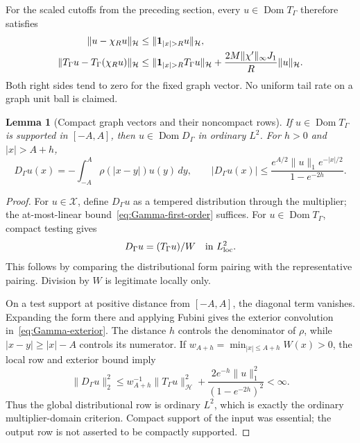 \documentclass[11pt,a4paper]{article}
\numberwithin{equation}{section}
\newtheorem{lemma}[theorem]{Lemma}
\theoremstyle{definition}
\theoremstyle{remark}
\newcommand{\Hh}{\mathcal H}
\newcommand{\norm}[1]{\lVert #1\rVert}
\begin{document}
For the scaled cutoffs from the preceding section, every $u\in\operatorname{Dom}T_\Gamma$ therefore satisfies
\begin{align}
 \norm{u-\chi_Ru}_{\Hh}&\le\norm{\boldsymbol1_{|x|>R}u}_{\Hh},\notag\\
 \norm{T_\Gamma u-T_\Gamma(\chi_Ru)}_{\Hh}
 &\le\norm{\boldsymbol1_{|x|>R}T_\Gamma u}_{\Hh}
       +\frac{2M\norm{\chi'}_\infty J_1}{R}\norm{u}_{\Hh}.
 \label{eq:Gamma-cutoff-graph}
\end{align}
Both right sides tend to zero for the fixed graph vector. No uniform tail rate on a graph unit ball is claimed.

\begin{lemma}[Compact graph vectors and their noncompact rows]\label{lem:Gamma-compact-row}
If $u\in\operatorname{Dom}T_\Gamma$ is supported in $[-A,A]$, then $u\in\operatorname{Dom}D_\Gamma$ in ordinary $L^2$. For $h>0$ and $|x|>A+h$,
\begin{equation}\label{eq:Gamma-exterior}
 D_\Gamma u(x)=-\int_{-A}^A\rho(|x-y|)u(y)\,dy,
 \qquad
 |D_\Gamma u(x)|\le
 \frac{e^{A/2}\norm{u}_1e^{-|x|/2}}{1-e^{-2h}}.
\end{equation}
\end{lemma}
\begin{proof}
For $u\in\mathcal X$, define $D_\Gamma u$ as a tempered distribution through the multiplier; the at-most-linear bound~\eqref{eq:Gamma-first-order} suffices. For $u\in\operatorname{Dom}T_\Gamma$, compact testing gives
\begin{equation}\label{eq:Gamma-local-row}
 D_\Gamma u=(T_\Gamma u)/W\quad\hbox{in }L^2_{\rm loc}.
\end{equation}
This follows by comparing the distributional form pairing with the representative pairing. Division by $W$ is legitimate locally only.

On a test support at positive distance from $[-A,A]$, the diagonal term vanishes. Expanding the form there and applying Fubini gives the exterior convolution in~\eqref{eq:Gamma-exterior}. The distance $h$ controls the denominator of $\rho$, while $|x-y|\ge|x|-A$ controls its numerator. If
$w_{A+h}=\min_{|x|\le A+h}W(x)>0$, the local row and exterior bound imply
\[
 \norm{D_\Gamma u}_2^2
 \le w_{A+h}^{-1}\norm{T_\Gamma u}_{\Hh}^2
       +\frac{2e^{-h}\norm{u}_1^2}{(1-e^{-2h})^2}<\infty.
\]
Thus the global distributional row is ordinary $L^2$, which is exactly the ordinary multiplier-domain criterion. Compact support of the input was essential; the output row is not asserted to be compactly supported.
\end{proof}
\end{document}
